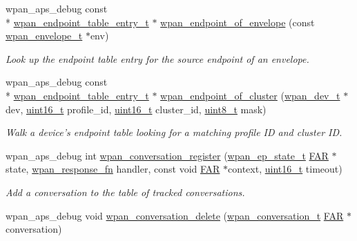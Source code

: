 \begin{DoxyCompactItemize}
wpan\-\_\-aps\-\_\-debug const \\*
\hyperlink{structwpan__endpoint__table__entry__t}{wpan\-\_\-endpoint\-\_\-table\-\_\-entry\-\_\-t} $\ast$ \hyperlink{group__wpan__aps_gab448ec18a47178272336da5eacfa2290}{wpan\-\_\-endpoint\-\_\-of\-\_\-envelope} (const \hyperlink{structwpan__envelope__t}{wpan\-\_\-envelope\-\_\-t} $\ast$env)
\begin{DoxyCompactList}\small\item\em Look up the endpoint table entry for the source endpoint of an envelope. \end{DoxyCompactList}\item 
wpan\-\_\-aps\-\_\-debug const \\*
\hyperlink{structwpan__endpoint__table__entry__t}{wpan\-\_\-endpoint\-\_\-table\-\_\-entry\-\_\-t} $\ast$ \hyperlink{group__wpan__aps_ga2cc975231963e0eb75c449c11b1d95de}{wpan\-\_\-endpoint\-\_\-of\-\_\-cluster} (\hyperlink{structwpan__dev__t}{wpan\-\_\-dev\-\_\-t} $\ast$dev, \hyperlink{group__hal_ga5a8b2dc9e45a9ee81a94ef304fb62505}{uint16\-\_\-t} profile\-\_\-id, \hyperlink{group__hal_ga5a8b2dc9e45a9ee81a94ef304fb62505}{uint16\-\_\-t} cluster\-\_\-id, \hyperlink{group__hal_gae1affc9ca37cfb624959c866a73f83c2}{uint8\-\_\-t} mask)
\begin{DoxyCompactList}\small\item\em Walk a device's endpoint table looking for a matching profile I\-D and cluster I\-D. \end{DoxyCompactList}\item 
wpan\-\_\-aps\-\_\-debug int \hyperlink{group__wpan__aps_gae5f88ed40bd334d963e261947b77b980}{wpan\-\_\-conversation\-\_\-register} (\hyperlink{structwpan__ep__state__t}{wpan\-\_\-ep\-\_\-state\-\_\-t} \hyperlink{group__hal_gaef060b3456fdcc093a7210a762d5f2ed}{F\-A\-R} $\ast$state, \hyperlink{group__wpan__aps_gaffe7bb679e9ba6de49f68fdc584fbefb}{wpan\-\_\-response\-\_\-fn} handler, const void \hyperlink{group__hal_gaef060b3456fdcc093a7210a762d5f2ed}{F\-A\-R} $\ast$context, \hyperlink{group__hal_ga5a8b2dc9e45a9ee81a94ef304fb62505}{uint16\-\_\-t} timeout)
\begin{DoxyCompactList}\small\item\em Add a conversation to the table of tracked conversations. \end{DoxyCompactList}\item 
wpan\-\_\-aps\-\_\-debug void \hyperlink{group__wpan__aps_gad36c04a3f2741f52710ab7768d1fcda8}{wpan\-\_\-conversation\-\_\-delete} (\hyperlink{structwpan__conversation__t}{wpan\-\_\-conversation\-\_\-t} \hyperlink{group__hal_gaef060b3456fdcc093a7210a762d5f2ed}{F\-A\-R} $\ast$conversation)

\end{DoxyCompactItemize}
